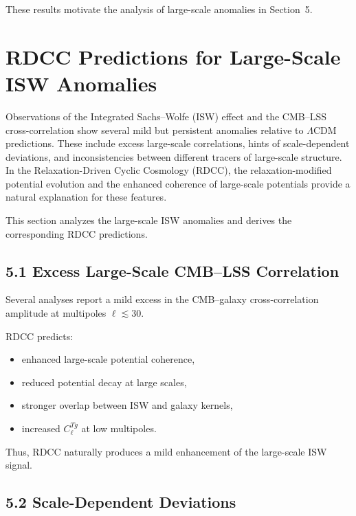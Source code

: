 \documentclass[11pt,a4paper]{article}
\begin{document}
These results motivate the analysis of large-scale anomalies in Section~5.

\section{RDCC Predictions for Large-Scale ISW Anomalies}

Observations of the Integrated Sachs–Wolfe (ISW) effect and the CMB–LSS cross-correlation 
show several mild but persistent anomalies relative to $\Lambda$CDM predictions. These 
include excess large-scale correlations, hints of scale-dependent deviations, and 
inconsistencies between different tracers of large-scale structure. In the 
Relaxation-Driven Cyclic Cosmology (RDCC), the relaxation-modified potential evolution and 
the enhanced coherence of large-scale potentials provide a natural explanation for these 
features.

This section analyzes the large-scale ISW anomalies and derives the corresponding RDCC 
predictions.

\subsection*{5.1 Excess Large-Scale CMB–LSS Correlation}

Several analyses report a mild excess in the CMB–galaxy cross-correlation amplitude at 
multipoles $\ell \lesssim 30$.

RDCC predicts:

\begin{itemize}
    \item enhanced large-scale potential coherence,
    \item reduced potential decay at large scales,
    \item stronger overlap between ISW and galaxy kernels,
    \item increased $C_{\ell}^{Tg}$ at low multipoles.
\end{itemize}

Thus, RDCC naturally produces a mild enhancement of the large-scale ISW signal.

\subsection*{5.2 Scale-Dependent Deviations}
\end{document}
